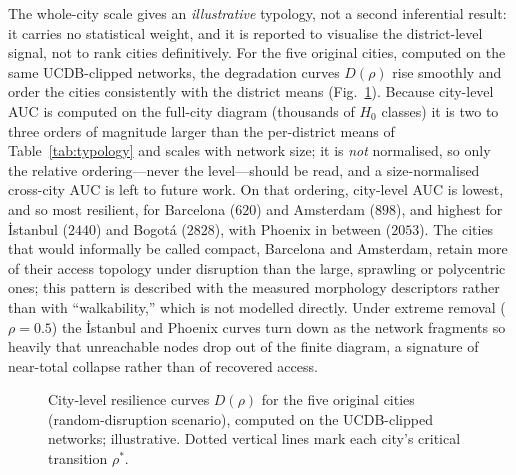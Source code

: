 \documentclass[sn-mathphys-num,pdflatex]{sn-jnl}
\newcommand{\Drho}{D(\rho)}
\newcommand{\rhostar}{\rho^{*}}
\begin{document}
The whole-city scale gives an \emph{illustrative} typology, not a second
inferential result: it carries no statistical weight, and it is reported to visualise
the district-level signal, not to rank cities definitively. For the five original
cities, computed on the same UCDB-clipped networks, the degradation curves $\Drho$
rise smoothly and order the cities consistently with the district means
(Fig.~\ref{fig:resilience}). Because city-level AUC is computed on the full-city
diagram (thousands of $H_0$ classes) it is two to three orders of magnitude larger
than the per-district means of Table~\ref{tab:typology} and scales with network
size; it is \emph{not} normalised, so only the relative ordering---never the
level---should be read, and a size-normalised cross-city AUC is left to future work.
On that ordering, city-level AUC is
lowest, and so most resilient, for Barcelona ($620$) and Amsterdam ($898$), and highest
for İstanbul ($2440$) and Bogotá ($2828$), with Phoenix in between ($2053$). The
cities that would informally be called compact, Barcelona and Amsterdam, retain more of
their access topology under disruption than the large, sprawling or polycentric
ones; this pattern is described with the measured morphology descriptors rather
than with ``walkability,'' which is not modelled directly. Under
extreme removal ($\rho=0.5$) the İstanbul and Phoenix curves turn down as the
network fragments so heavily that unreachable nodes drop out of the finite
diagram, a signature of near-total collapse rather than of recovered access.

\begin{figure}[t]\centering
{}
\caption{City-level resilience curves $\Drho$ for the five original cities
(random-disruption scenario), computed on the UCDB-clipped networks; illustrative.
Dotted vertical lines mark each city's critical transition $\rhostar$.}
\label{fig:resilience}
\end{figure}
\end{document}
